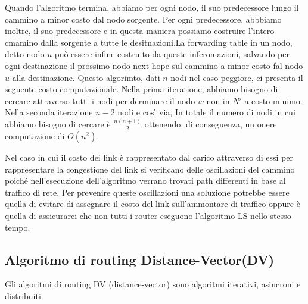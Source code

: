 \documentclass{book}
\begin{document}
Quando l'algoritmo termina, abbiamo per ogni nodo, il suo predecessore lungo
il cammino a minor costo dal nodo sorgente. Per ogni predecessore, abbbiamo
inoltre, il suo predecessore e in questa maniera possiamo costruire l'intero
cmamino dalla sorgente a tutte le desitnazioni.La forwarding table in un nodo,
detto nodo $u$ pu{\`o} essere infine costruito da queste inferomazioni,
salvando per ogni destinazione il prossimo nodo next-hope sul cammino a minor
costo fal nodo $u$ alla destinazione.
{}
Questo algorimto, dati $n$ nodi nel caso peggiore, ci presenta il seguente
costo computazionale. Nella prima iteratione, abbiamo bisogno di cercare
attraverso tutti i nodi per derminare il nodo $w$ non in $N'$ a costo minimo.
Nella seconda iterazione $n - 2$ nodi e cos{\`i} via, In totale il numero di
nodi in cui abbiamo bisogno di cercare {\`e} $\frac{n (n + 1)}{2}$ ottenendo,
di conseguenza, un onere computazione di $O (n^2)$.

Nel caso in cui il costo dei link {\`e} rappresentato dal carico attraverso di
essi per rappresentare la congestione del link si verificano delle
oscillazioni del cammino poich{\'e} nell'esecuzione dell'algoritmo verrano
trovati path differenti in base al traffico di rete. Per prevenire queste
oscillazioni una soluzione potrebbe essere quella di evitare di assegnare il
costo del link sull'ammontare di traffico oppure {\`e} quella di assicurarci
che non tutti i router eseguono l'algoritmo LS nello stesso tempo.

\subsection{Algoritmo di routing Distance-Vector(DV) }

Gli algoritmi di routing DV (distance-vector) sono algoritmi iterativi,
asincroni e distribuiti.
\end{document}
